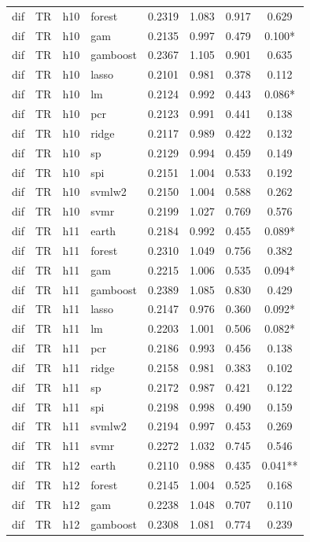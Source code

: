 \begin{ThreePartTable}
\begin{longtable}[t]{llclcccc}
dif & TR & h10 & forest & 0.2319 & 1.083 & 0.917 & 0.629\\
dif & TR & h10 & gam & 0.2135 & 0.997 & 0.479 & 0.100*\\
dif & TR & h10 & gamboost & 0.2367 & 1.105 & 0.901 & 0.635\\
dif & TR & h10 & lasso & 0.2101 & 0.981 & 0.378 & 0.112\\
dif & TR & h10 & lm & 0.2124 & 0.992 & 0.443 & 0.086*\\
dif & TR & h10 & pcr & 0.2123 & 0.991 & 0.441 & 0.138\\
dif & TR & h10 & ridge & 0.2117 & 0.989 & 0.422 & 0.132\\
dif & TR & h10 & sp & 0.2129 & 0.994 & 0.459 & 0.149\\
dif & TR & h10 & spi & 0.2151 & 1.004 & 0.533 & 0.192\\
dif & TR & h10 & svmlw2 & 0.2150 & 1.004 & 0.588 & 0.262\\
dif & TR & h10 & svmr & 0.2199 & 1.027 & 0.769 & 0.576\\
\addlinespace
dif & TR & h11 & earth & 0.2184 & 0.992 & 0.455 & 0.089*\\
dif & TR & h11 & forest & 0.2310 & 1.049 & 0.756 & 0.382\\
dif & TR & h11 & gam & 0.2215 & 1.006 & 0.535 & 0.094*\\
dif & TR & h11 & gamboost & 0.2389 & 1.085 & 0.830 & 0.429\\
dif & TR & h11 & lasso & 0.2147 & 0.976 & 0.360 & 0.092*\\
dif & TR & h11 & lm & 0.2203 & 1.001 & 0.506 & 0.082*\\
dif & TR & h11 & pcr & 0.2186 & 0.993 & 0.456 & 0.138\\
dif & TR & h11 & ridge & 0.2158 & 0.981 & 0.383 & 0.102\\
dif & TR & h11 & sp & 0.2172 & 0.987 & 0.421 & 0.122\\
dif & TR & h11 & spi & 0.2198 & 0.998 & 0.490 & 0.159\\
dif & TR & h11 & svmlw2 & 0.2194 & 0.997 & 0.453 & 0.269\\
dif & TR & h11 & svmr & 0.2272 & 1.032 & 0.745 & 0.546\\
\addlinespace
dif & TR & h12 & earth & 0.2110 & 0.988 & 0.435 & 0.041**\\
dif & TR & h12 & forest & 0.2145 & 1.004 & 0.525 & 0.168\\
dif & TR & h12 & gam & 0.2238 & 1.048 & 0.707 & 0.110\\
dif & TR & h12 & gamboost & 0.2308 & 1.081 & 0.774 & 0.239\\

\end{longtable}
\end{ThreePartTable}
